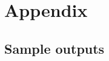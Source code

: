 \cleardoublepage
\renewcommand{\thesection}{\Alph{section}}%

\chapter[Appendix]{Appendix}
\section{Sample outputs}
\label{sql:cond_norm}
